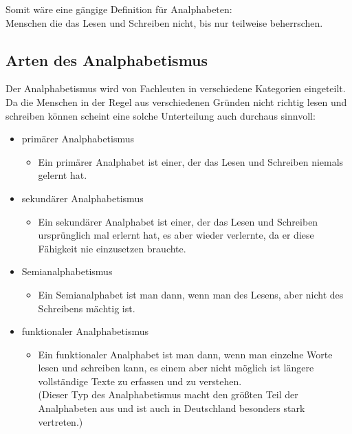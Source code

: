 Somit wäre eine gängige Definition für Analphabeten:\\


Menschen die das Lesen und Schreiben nicht, bis nur teilweise beherrschen.


\subsection{Arten des Analphabetismus}

Der Analphabetismus wird von Fachleuten in verschiedene Kategorien eingeteilt. Da die Menschen in der Regel aus verschiedenen Gründen nicht richtig lesen und schreiben können scheint eine solche Unterteilung auch durchaus sinnvoll:

\begin{itemize}
	\item primärer Analphabetismus


				\begin{itemize}


					  \item Ein primärer Analphabet ist einer, der das Lesen und Schreiben niemals gelernt hat.


				\end{itemize}


	\item sekundärer Analphabetismus


				\begin{itemize}


					  \item Ein sekundärer Analphabet ist einer, der das Lesen und Schreiben ursprünglich mal erlernt hat, es aber wieder verlernte, da er diese Fähigkeit nie einzusetzen brauchte.


				\end{itemize}


	\item Semianalphabetismus


				\begin{itemize}


					  \item Ein Semianalphabet ist man dann, wenn man des Lesens, aber nicht des Schreibens mächtig ist.


				\end{itemize}


	\item funktionaler Analphabetismus


				\begin{itemize}


					  \item Ein funktionaler Analphabet ist man dann, wenn man einzelne Worte lesen und schreiben kann, es einem aber nicht möglich ist längere vollständige Texte zu erfassen und zu verstehen.\\
						(Dieser Typ des Analphabetismus macht den größten Teil der Analphabeten aus und ist auch in Deutschland besonders stark vertreten.)


				\end{itemize}


\end{itemize}


